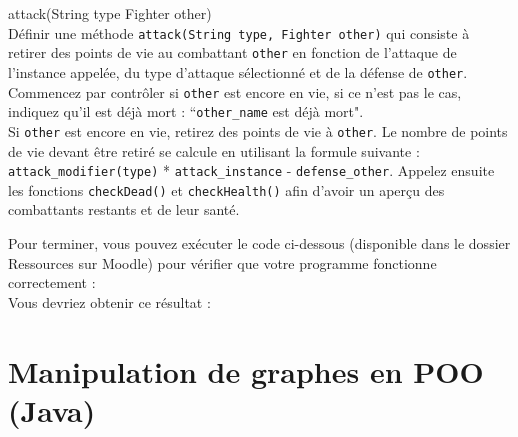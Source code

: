 \begin{Exercice}[10 minutes] attack(String type Fighter other)\\
    Définir une méthode \lstinline{attack(String type, Fighter other)} qui consiste à retirer des points de vie au combattant \lstinline{other} en fonction de l'attaque de l'instance appelée, du type d'attaque sélectionné et de la défense de \lstinline{other}. \\
    
    Commencez par contrôler si \lstinline{other} est encore en vie, si ce n'est pas le cas, indiquez qu'il est déjà mort : ``\lstinline{other_name} est déjà mort". \\
    
     Si \lstinline{other} est encore en vie, retirez des points de vie à \lstinline{other}. Le nombre de points de vie devant être retiré se calcule en utilisant la formule suivante : \lstinline{attack_modifier(type)} * \lstinline{attack_instance} - \lstinline{defense_other}. Appelez ensuite les fonctions \lstinline{checkDead()} et \lstinline{checkHealth()} afin d'avoir un aperçu des combattants restants et de leur santé.
    


\begin{solution}
	
\end{solution}
\end{Exercice}


Pour terminer, vous pouvez exécuter le code ci-dessous (disponible dans le dossier Ressources sur Moodle) pour vérifier que votre programme fonctionne correctement : \\



Vous devriez obtenir ce résultat : \\



\newpage

\section{Manipulation de graphes en POO (Java)}



